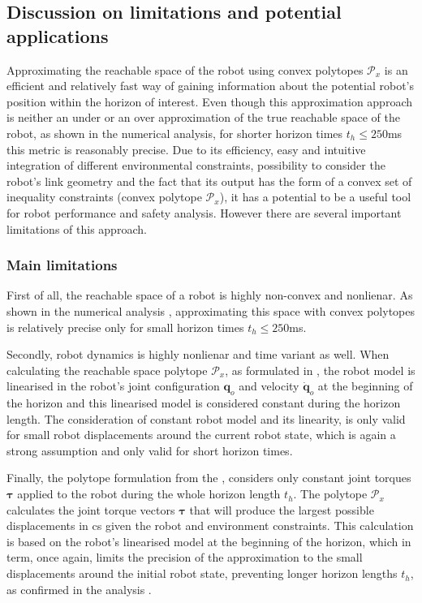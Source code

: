 \subsection{Discussion on limitations and potential applications}
\label{ch:discussion}

Approximating the reachable space of the robot using convex polytopes $\mathcal{P}_x$ is an efficient and relatively fast way of gaining information about the potential robot's position within the horizon of interest. Even though this approximation approach is neither an under or an over approximation of the true reachable space of the robot, as shown in the numerical analysis, for shorter horizon times $t_h\leq250$ms this metric is reasonably precise. Due to its efficiency, easy and intuitive integration of different environmental constraints, possibility to consider the robot's link geometry and the fact that its output has the form of a convex set of inequality constraints (convex polytope $\mathcal{P}_x$), it has a potential to be a useful tool for robot performance and safety analysis. However there are several important limitations of this approach.

\subsubsection{Main limitations }

First of all, the reachable space of a robot is highly non-convex and nonlienar. As shown in the numerical analysis , approximating this space with convex polytopes is relatively precise only for small horizon times $t_h\leq250$ms.

Secondly, robot dynamics is highly nonlienar and time variant as well. When calculating the reachable space polytope $\mathcal{P}_x$, as formulated in , the robot model is linearised in the robot's joint configuration $\bm{q}_o$ and velocity $\dot{\bm{q}}_o$  at the beginning of the horizon and this linearised model is considered constant during the horizon length. The consideration of constant robot model and its linearity, is only valid for small robot displacements around the current robot %
state, which is again a strong assumption and only valid for short horizon times. 

Finally, the polytope formulation from the , considers only constant joint torques $\bm{\tau}$ applied to the robot during the whole horizon length $t_h$. The polytope $\mathcal{P}_x$ calculates the joint torque vectors $\bm{\tau}$ that will produce the largest possible displacements in \gls{cs} given the robot and environment constraints. This calculation is based on the robot's linearised model at the beginning of the horizon, which in term, once again, limits the precision of the approximation to the small displacements around the initial robot state, preventing longer horizon lengths $t_h$, as confirmed in the analysis .


